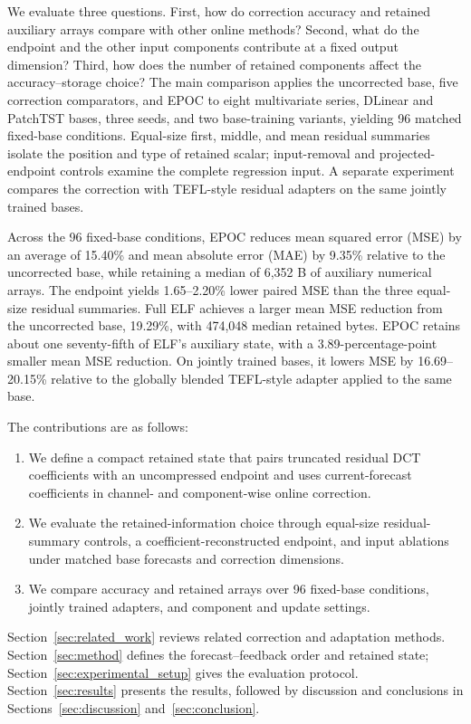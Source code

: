 We evaluate three questions. First, how do correction accuracy and retained auxiliary arrays compare with other online methods? Second, what do the endpoint and the other input components contribute at a fixed output dimension? Third, how does the number of retained components affect the accuracy--storage choice? The main comparison applies the uncorrected base, five correction comparators, and EPOC to eight multivariate series, DLinear and PatchTST bases, three seeds, and two base-training variants, yielding 96 matched fixed-base conditions. Equal-size first, middle, and mean residual summaries isolate the position and type of retained scalar; input-removal and projected-endpoint controls examine the complete regression input. A separate experiment compares the correction with TEFL-style residual adapters on the same jointly trained bases.

Across the 96 fixed-base conditions, EPOC reduces mean squared error (MSE) by an average of 15.40\% and mean absolute error (MAE) by 9.35\% relative to the uncorrected base, while retaining a median of 6,352 B of auxiliary numerical arrays. The endpoint yields 1.65--2.20\% lower paired MSE than the three equal-size residual summaries. Full ELF achieves a larger mean MSE reduction from the uncorrected base, 19.29\%, with 474,048 median retained bytes. EPOC retains about one seventy-fifth of ELF's auxiliary state, with a 3.89-percentage-point smaller mean MSE reduction. On jointly trained bases, it lowers MSE by 16.69--20.15\% relative to the globally blended TEFL-style adapter applied to the same base.

The contributions are as follows:
\begin{enumerate}
\item We define a compact retained state that pairs truncated residual DCT coefficients with an uncompressed endpoint and uses current-forecast coefficients in channel- and component-wise online correction.
\item We evaluate the retained-information choice through equal-size residual-summary controls, a coefficient-reconstructed endpoint, and input ablations under matched base forecasts and correction dimensions.
\item We compare accuracy and retained arrays over 96 fixed-base conditions, jointly trained adapters, and component and update settings.
\end{enumerate}

Section~\ref{sec:related_work} reviews related correction and adaptation methods. Section~\ref{sec:method} defines the forecast--feedback order and retained state; Section~\ref{sec:experimental_setup} gives the evaluation protocol. Section~\ref{sec:results} presents the results, followed by discussion and conclusions in Sections~\ref{sec:discussion} and~\ref{sec:conclusion}.
